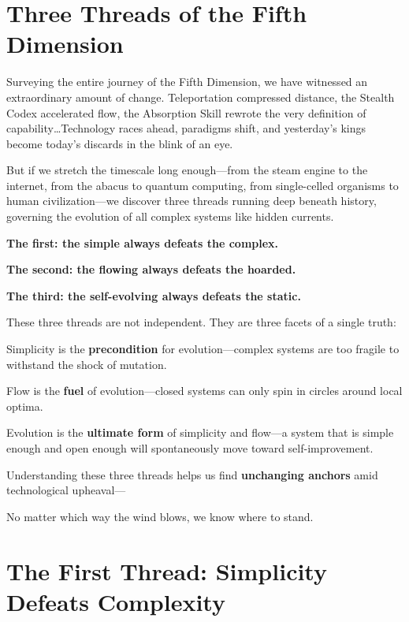 \section{Three Threads of the Fifth Dimension}

Surveying the entire journey of the Fifth Dimension, we have witnessed an extraordinary amount of change.
Teleportation compressed distance, the Stealth Codex accelerated flow, the Absorption Skill rewrote the very definition of capability\ldots Technology races ahead, paradigms shift, and yesterday's kings become today's discards in the blink of an eye.

But if we stretch the timescale long enough---from the steam engine to the internet, from the abacus to quantum computing, from single-celled organisms to human civilization---we discover three threads running deep beneath history, governing the evolution of all complex systems like hidden currents.

\textbf{The first: the simple always defeats the complex.}

\textbf{The second: the flowing always defeats the hoarded.}

\textbf{The third: the self-evolving always defeats the static.}

\vspace{1em}

These three threads are not independent. They are three facets of a single truth:

Simplicity is the \textbf{precondition} for evolution---complex systems are too fragile to withstand the shock of mutation.

Flow is the \textbf{fuel} of evolution---closed systems can only spin in circles around local optima.

Evolution is the \textbf{ultimate form} of simplicity and flow---a system that is simple enough and open enough will spontaneously move toward self-improvement.

\vspace{1em}

Understanding these three threads helps us find \textbf{unchanging anchors} amid technological upheaval---

No matter which way the wind blows, we know where to stand.

\newpage
\section{The First Thread: Simplicity Defeats Complexity}

